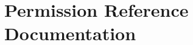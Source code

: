 \documentclass[letterpaper,12pt]{report}
\begin{document}








\chapter{Permission Reference Documentation}
\end{document}
